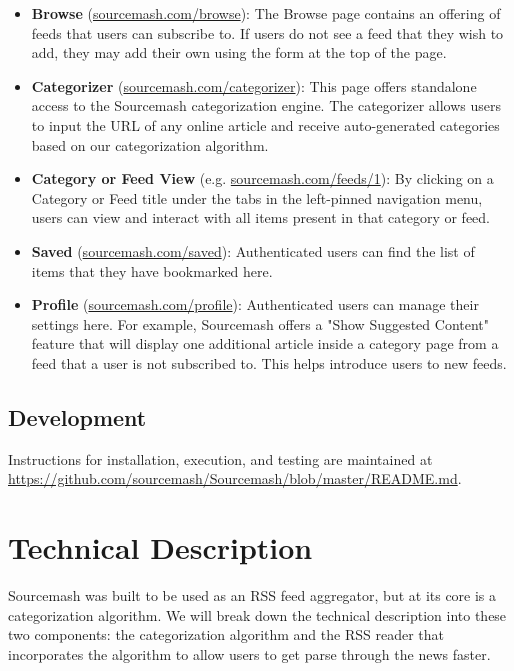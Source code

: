 \documentclass[11pt]{article}
\begin{document}
\begin{itemize}
	\item \textbf{Browse} (\url{sourcemash.com/browse}): The Browse page contains an offering of feeds that users can subscribe to. If users do not see a feed that they wish to add, they may add their own using the form at the top of the page.
	\item \textbf{Categorizer} (\url{sourcemash.com/categorizer}): This page offers standalone access to the Sourcemash categorization engine. The categorizer allows users to input the URL of any online article and receive auto-generated categories based on our categorization algorithm.
	\item \textbf{Category or Feed View} (e.g. \url{sourcemash.com/feeds/1}): By clicking on a Category or Feed title under the tabs in the left-pinned navigation menu, users can view and interact with all items present in that category or feed.
	\item \textbf{Saved} (\url{sourcemash.com/saved}): Authenticated users can find the list of items that they have bookmarked here.
	\item \textbf{Profile} (\url{sourcemash.com/profile}): Authenticated users can manage their settings here. For example, Sourcemash offers a "Show Suggested Content" feature that will display one additional article inside a category page from a feed that a user is not subscribed to. This helps introduce users to new feeds.
\end{itemize}

\subsection{Development}

Instructions for installation, execution, and testing are maintained at \url{https://github.com/sourcemash/Sourcemash/blob/master/README.md}.



\section{Technical Description}

Sourcemash was built to be used as an RSS feed aggregator, but at its core is a categorization algorithm. We will break down the technical description into these two components: the categorization algorithm and the RSS reader that incorporates the algorithm to allow users to get parse through the news faster.
\end{document}
